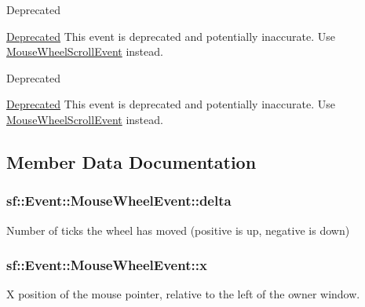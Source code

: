 \begin{DoxyRefDesc}{Deprecated}
\item[\hyperlink{deprecated__deprecated000001}{Deprecated}]This event is deprecated and potentially inaccurate. Use \hyperlink{structsf_1_1_event_1_1_mouse_wheel_scroll_event}{Mouse\-Wheel\-Scroll\-Event} instead.\end{DoxyRefDesc}


\begin{DoxyRefDesc}{Deprecated}
\item[\hyperlink{deprecated__deprecated000018}{Deprecated}]This event is deprecated and potentially inaccurate. Use \hyperlink{structsf_1_1_event_1_1_mouse_wheel_scroll_event}{Mouse\-Wheel\-Scroll\-Event} instead.\end{DoxyRefDesc}


\subsection{Member Data Documentation}
\hypertarget{structsf_1_1_event_1_1_mouse_wheel_event_a4d02b524b5530c7863e7b0f211fa522c}{
\subsubsection[{delta}]{ sf\-::\-Event\-::\-Mouse\-Wheel\-Event\-::delta}}\label{structsf_1_1_event_1_1_mouse_wheel_event_a4d02b524b5530c7863e7b0f211fa522c}


Number of ticks the wheel has moved (positive is up, negative is down) 

\hypertarget{structsf_1_1_event_1_1_mouse_wheel_event_a3079803f836ed7208f43b60332ab053e}{
\subsubsection[{x}]{ sf\-::\-Event\-::\-Mouse\-Wheel\-Event\-::x}}\label{structsf_1_1_event_1_1_mouse_wheel_event_a3079803f836ed7208f43b60332ab053e}


X position of the mouse pointer, relative to the left of the owner window. 

